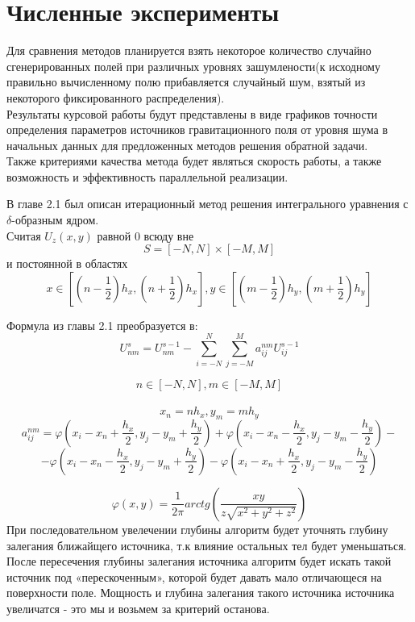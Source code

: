 \documentclass[12pt]{article}
\begin{document}
\section
{Численные эксперименты}

Для сравнения методов планируется взять некоторое количество случайно сгенерированных полей при различных уровнях зашумлености(к исходному правильно вычисленному полю прибавляется случайный шум, взятый из некоторого фиксированного распределения).\\
Результаты курсовой работы будут представлены в виде графиков точности определения параметров источников гравитационного поля от уровня шума в начальных данных для предложенных методов решения обратной задачи.\\
Также критериями качества метода будет являться скорость работы, а также возможность и эффективность параллельной реализации.


В главе 2.1 был описан итерационный метод решения интегрального уравнения с $\delta$-образным ядром.\\
 Считая $U_z(x,y)$ равной 0 всюду вне $$S = \left[{-N, N} \right] \times \left[{-M, M} \right] $$ 
и постоянной в областях $$x \in \left[{\left({n-\frac{1}{2}}\right)h_x,\left({n+\frac{1}{2}}\right)h_x} \right] , y \in \left[\left({m-\frac{1}{2}}\right)h_y,\left({m+\frac{1}{2}}\right)h_y \right] $$ 

Формула из главы 2.1 преобразуется в:\\
\[U_{nm}^s=U_{nm}^{s-1}-\sum_{i=-N}^N{\sum_{j=-M}^M a_{ij}^{nm}U_{ij}^{s-1}}\]

$$n \in \left[{-N,N} \right] , m \in \left[{-M, M} \right] $$\\
$$x_n=nh_x, y_m=mh_y$$
\[a_{ij}^{nm} = \varphi(x_i-x_n+\frac{h_x}{2},y_j-y_m+\frac{h_y}{2}) + \varphi(x_i-x_n-\frac{h_x}{2},y_j-y_m-\frac{h_y}{2}) -\] \[- \varphi(x_i-x_n-\frac{h_x}{2},y_j-y_m+\frac{h_y}{2}) - \varphi(x_i-x_n+\frac{h_x}{2},y_j-y_m-\frac{h_y}{2})\]

\[\varphi(x,y)=\frac{1}{2\pi}arctg\left({\frac{xy}{z\sqrt{x^2+y^2+z^2}}}\right)\]
\newline
При последовательном увелечении глубины алгоритм будет уточнять глубину залегания ближайщего источника, т.к влияние остальных тел будет уменьшаться.
После пересечения глубины залегания источника алгоритм будет искать такой источник под «перескоченным», которой будет давать мало отличающеся на поверхности поле. Мощность и глубина залегания такого источника источника увеличатся - это мы и возьмем за критерий останова.
\end{document}
